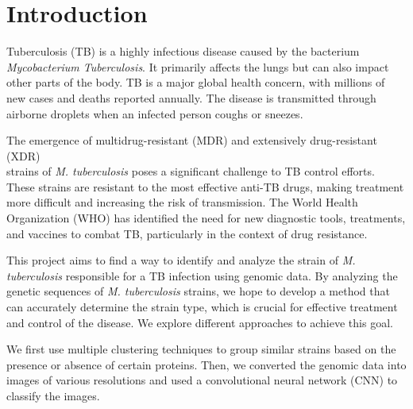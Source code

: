 \chapter{Introduction}
\label{chap:introduction}

Tuberculosis (TB) is a highly infectious disease caused by the bacterium \textit{Mycobacterium Tuberculosis}.
It primarily affects the lungs but can also impact other parts of the body. TB is a major global health concern,
with millions of new cases and deaths reported annually. The disease is transmitted through airborne droplets
when an infected person coughs or sneezes.

The emergence of multidrug-resistant (MDR) and extensively drug-resistant (XDR)\\strains of \textit{M. tuberculosis}
poses a significant challenge to TB control efforts. These strains are resistant to the most effective anti-TB drugs,
making treatment more difficult and increasing the risk of transmission. The World Health Organization (WHO) has
identified the need for new diagnostic tools, treatments, and vaccines to combat TB, particularly in the context of
drug resistance.

This project aims to find a way to identify and analyze the strain of \textit{M. tuberculosis} responsible for a TB infection
using genomic data. By analyzing the genetic sequences of \textit{M. tuberculosis} strains, we hope to develop a method that can
accurately determine the strain type, which is crucial for effective treatment and control of the disease. We explore
different approaches to achieve this goal.

We first use multiple clustering techniques to group similar strains based on the presence or absence of certain proteins.
Then, we converted the genomic data into images of various resolutions and used a convolutional neural network (CNN) to
classify the images.

